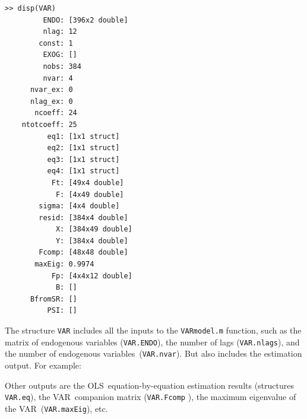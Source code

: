 \documentclass[10pt]{article}
\begin{document}
\setlength{\parindent}{.2cm}
\begin{verbatim}
>> disp(VAR)
         ENDO: [396x2 double]
         nlag: 12
        const: 1
         EXOG: []
         nobs: 384
         nvar: 4
      nvar_ex: 0
      nlag_ex: 0
       ncoeff: 24
    ntotcoeff: 25
          eq1: [1x1 struct]
          eq2: [1x1 struct]
          eq3: [1x1 struct]
          eq4: [1x1 struct]
           Ft: [49x4 double]
            F: [4x49 double]
        sigma: [4x4 double]
        resid: [384x4 double]
            X: [384x49 double]
            Y: [384x4 double]
        Fcomp: [48x48 double]
       maxEig: 0.9974
           Fp: [4x4x12 double]
            B: []
      BfromSR: []
          PSI: []
\end{verbatim}

\setlength{\parindent}{.0cm}

The structure \texttt{VAR} includes all the inputs to the \texttt{VARmodel.m}
function, such as the matrix of endogenous variables (\texttt{VAR.ENDO}),
the number of lags (\texttt{VAR.nlags}), and the number of endogenous
variables\ (\texttt{VAR.nvar}). But also includes the estimation output. For
example:


Other outputs are the OLS\ equation-by-equation estimation results
(structures \texttt{VAR.eq}), the VAR\ companion matrix (\texttt{VAR.Fcomp}%
), the maximum eigenvalue of the VAR\ (\texttt{VAR.maxEig}), etc.\
\end{document}
